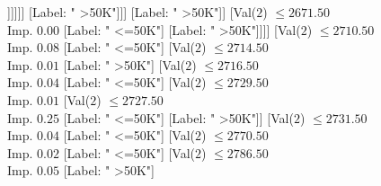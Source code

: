 \documentclass[margin=10pt]{standalone}
\begin{document}
\begin{forest}
																										[Val($2$) $ \leq 2533.50$ \\ Imp. $0.03$
																											[Label: " >50K"]
																											[Val($2$) $ \leq 2611.50$ \\ Imp. $0.01$
																												[Val($2$) $ \leq 2542.50$ \\ Imp. $0.01$
																													[Label: " >50K"]
																													[Val($2$) $ \leq 2562.50$ \\ Imp. $0.02$
																														[Label: " >50K"]
																														[Val($2$) $ \leq 2571.50$ \\ Imp. $0.11$
																															[Label: " >50K"]
																															[Val($2$) $ \leq 2578.50$ \\ Imp. $0.02$
																																[Label: " <=50K"]
																																[Val($2$) $ \leq 2583.50$ \\ Imp. $0.25$
																																	[Label: " >50K"]
																																	[Label: " <=50K"]]]]]]
																												[Label: " >50K"]]]
																										[Label: " >50K"]]
																									[Val($2$) $ \leq 2671.50$ \\ Imp. $0.00$
																										[Label: " <=50K"]
																										[Label: " >50K"]]]]
																							[Val($2$) $ \leq 2710.50$ \\ Imp. $0.08$
																								[Label: " <=50K"]
																								[Val($2$) $ \leq 2714.50$ \\ Imp. $0.01$
																									[Label: " >50K"]
																									[Val($2$) $ \leq 2716.50$ \\ Imp. $0.04$
																										[Label: " <=50K"]
																										[Val($2$) $ \leq 2729.50$ \\ Imp. $0.01$
																											[Val($2$) $ \leq 2727.50$ \\ Imp. $0.25$
																												[Label: " <=50K"]
																												[Label: " >50K"]]
																											[Val($2$) $ \leq 2731.50$ \\ Imp. $0.04$
																												[Label: " <=50K"]
																												[Val($2$) $ \leq 2770.50$ \\ Imp. $0.02$
																													[Label: " <=50K"]
																													[Val($2$) $ \leq 2786.50$ \\ Imp. $0.05$
																														[Label: " >50K"]

\end{forest}
\end{document}
